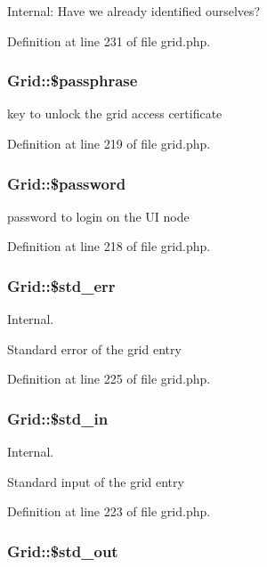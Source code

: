 Internal: Have we already identified ourselves? 



Definition at line 231 of file grid.php.
\subsubsection{\setlength{\rightskip}{0pt plus 5cm}Grid::\$passphrase}\label{classGrid_o4}


key to unlock the grid access certificate 



Definition at line 219 of file grid.php.
\subsubsection{\setlength{\rightskip}{0pt plus 5cm}Grid::\$password}\label{classGrid_o3}


password to login on the UI node 



Definition at line 218 of file grid.php.
\subsubsection{\setlength{\rightskip}{0pt plus 5cm}Grid::\$std\_\-err}\label{classGrid_o9}


Internal. 

Standard error of the grid entry 

Definition at line 225 of file grid.php.
\subsubsection{\setlength{\rightskip}{0pt plus 5cm}Grid::\$std\_\-in}\label{classGrid_o7}


Internal. 

Standard input of the grid entry 

Definition at line 223 of file grid.php.
\subsubsection{\setlength{\rightskip}{0pt plus 5cm}Grid::\$std\_\-out}\label{classGrid_o8}


